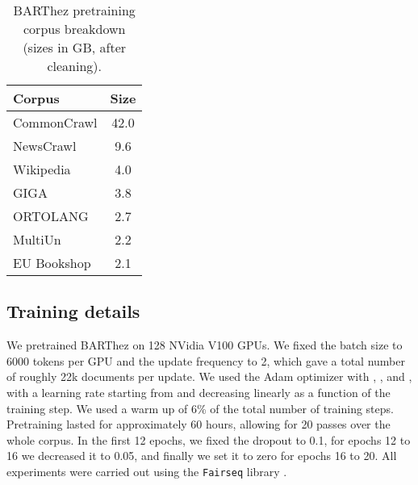 \documentclass[11pt,a4paper]{article}
\begin{document}
\begin{table}[ht]
  \begin{center}
  \small
    \begin{tabular}{|l|c|}
    \hline
      \textbf{Corpus} & \textbf{Size}\\
      \hline
      CommonCrawl & 42.0 \\
      NewsCrawl \cite{li2019findings} & 9.6 \\
      Wikipedia & 4.0 \\
      GIGA \cite{tiedemann2012parallel} & 3.8 \\
      ORTOLANG \cite{11403/est_republicain/v4} & 2.7\\
      MultiUn \cite{eisele2010multiun} & 2.2\\
      EU Bookshop \cite{skadicnvs2014billions}  & 2.1\\
      \hline
    \end{tabular}
  \end{center}
  \caption{BARThez pretraining corpus breakdown (sizes in GB, after cleaning). \label{table:datasets}}
\end{table}

\subsection{Training details}
We pretrained BARThez on 128 NVidia V100 GPUs. We fixed the batch size to 6000 tokens per GPU and the update frequency to 2, which gave a total number of roughly 22k documents per update.
We used the Adam optimizer \cite{kingma2014adam} with , , and , with a learning rate starting from  and decreasing linearly as a function of the training step.
We used a warm up of 6\% of the total number of training steps.
Pretraining lasted for approximately 60 hours, allowing for 20 passes over the whole corpus.
In the first 12 epochs, we fixed the dropout to 0.1, for epochs 12 to 16 we decreased it to 0.05, and finally we set it to zero for epochs 16 to 20.
All experiments were carried out using the \texttt{Fairseq} library \cite{ott2019fairseq}. 
\end{document}
